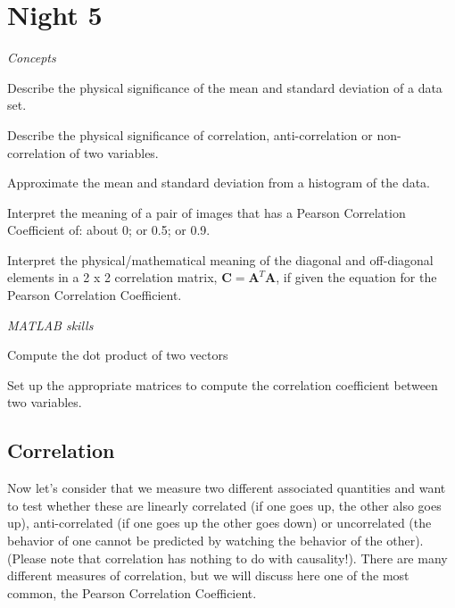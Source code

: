 \chapter{Night 5}

\begin{learningobjectives}
\emph{Concepts}
\bi
\item Describe the physical significance of the mean and standard deviation of a data set.
\item Describe the physical significance of correlation, anti-correlation or non-correlation of two variables.
\item Approximate the mean and standard deviation from a histogram of the data.
\item Interpret the meaning of a pair of images that has a Pearson Correlation Coefficient of:  about 0; or 0.5; or 0.9. 
\item Interpret the physical/mathematical meaning of the diagonal and off-diagonal elements in a 2 x 2 correlation matrix, $\mathbf{C} = \mathbf{A}^T\mathbf{A}$, if given the equation for the Pearson Correlation Coefficient. 

\ei
\emph{MATLAB skills}
\bi
\item Compute the dot product of two vectors
\item Set up the appropriate matrices to compute the correlation coefficient between two variables.
\ei
\end{learningobjectives}

\section{Correlation}

Now let's consider that we measure two different associated quantities and want to test whether these are linearly correlated (if one goes up, the other also goes up), anti-correlated (if one goes up the other goes down) or uncorrelated (the behavior of one cannot be predicted by watching the behavior of the other).  (Please note that correlation has nothing to do with causality!).  There are many different measures of correlation, but we will discuss here one of the most common, the Pearson Correlation Coefficient.

